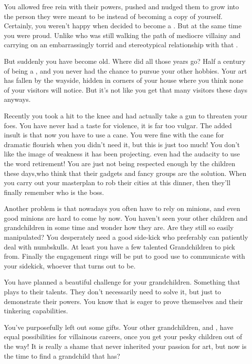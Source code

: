 \documentclass[char]{LRSguildcamp1}
\begin{document}
You allowed \cYoungest{} free rein with their powers, pushed and nudged them to grow into the person they were meant to be instead of becoming a copy of yourself. Certainly, you weren't happy when \cYoungest{} decided to become a \cYoungest{\hero}. But at the same time you were proud. Unlike \cOldest{} who was still walking the path of mediocre villainy and carrying on an embarrassingly torrid and stereotypical relationship with that \cOS{\hero}. 

But suddenly you have become old. Where did all those years go? Half a century of being a \cGrandma{\villain}, and you never had the chance to pursue your other hobbies. Your art has fallen by the wayside, hidden in corners of your house where you think none of your visitors will notice. But it's not like you get that many visitors these days anyways.

Recently you took a hit to the knee and had actually take a gun to threaten your foes. You have never had a taste for violence, it is far too vulgar. The added insult is that now you have to use a cane. You were fine with the cane for dramatic flourish when you didn't need it, but this is just too much! You don't like the image of weakness it has been projecting. \cOldest{} even had the audacity to use the word retirement! You are just not being respected enough by the children these days,who think that their gadgets and fancy groups are the solution. When you carry out your masterplan to rob their cities at this dinner, then they'll finally remember who is the boss. 

Another problem is that nowadays you often have to rely on minions, and even good minions are hard to come by now. You haven't seen your other children and grandchildren in some time and wonder how they are. Are they still so easily manipulated? You desperately need a good side-kick who preferably can patiently deal with numbskulls.  At least you have a few talented Grandchildren to pick from. Finally the engagement rings will be put to good use to communicate with your sidekick, whoever that turns out to be. 

You have planned a beautiful challenge for your grandchildren. Something that plays to their talents. They don't necessarily need to solve it, but just to demonstrate their powers. You know that \cTeen{} is eager to prove themselves and their tinkering capabilities. 

You've purposefully left out some gifts. Your other grandchildren, \cGrad{} and \cTween{}, have equal possibilities for villainous careers, once you get your pesky children out of the way! It is really a shame that \cYoungest {} never inherited your passion for art, but now is the time to find a grandchild that has? 
\end{document}
